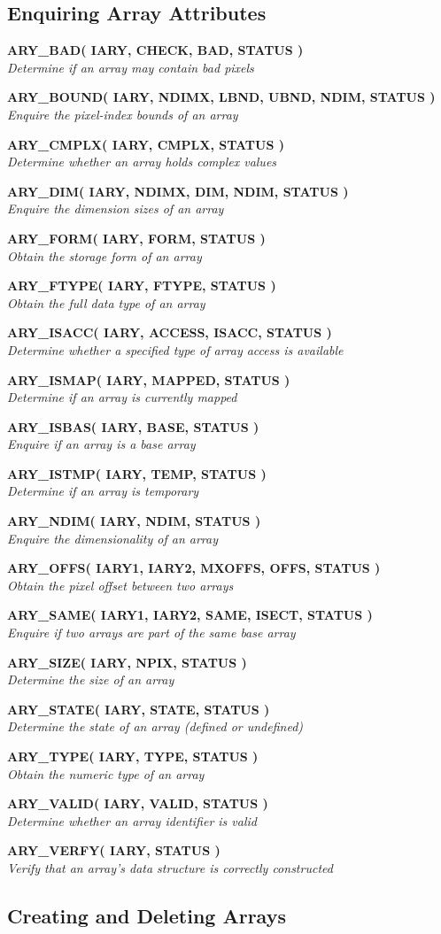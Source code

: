 \documentclass[twoside,11pt]{article}
\newcommand{\xlabel}[1]{}
\newcommand{\noteroutine}[2]{\textbf{#1}\hspace*{\fill}\nopagebreak \\
                             \hspace*{3em}\emph{#2}\hspace*{\fill}\par}
\begin{document}
\begin{eqn*}
\subsection{\xlabel{enquiring_array_attributes}Enquiring Array Attributes}
\label{enquiring_array_attributes}

\noteroutine{ARY\_BAD( IARY, CHECK, BAD, STATUS )}
            {Determine if an array may contain bad pixels}
\noteroutine{ARY\_BOUND( IARY, NDIMX, LBND, UBND, NDIM, STATUS )}
            {Enquire the pixel-index bounds of an array}
\noteroutine{ARY\_CMPLX( IARY, CMPLX, STATUS )}
            {Determine whether an array holds complex values}
\noteroutine{ARY\_DIM( IARY, NDIMX, DIM, NDIM, STATUS )}
            {Enquire the dimension sizes of an array}
\noteroutine{ARY\_FORM( IARY, FORM, STATUS )}
            {Obtain the storage form of an array}
\noteroutine{ARY\_FTYPE( IARY, FTYPE, STATUS )}
            {Obtain the full data type of an array}
\noteroutine{ARY\_ISACC( IARY, ACCESS, ISACC, STATUS )}
            {Determine whether a specified type of array access is available}
\noteroutine{ARY\_ISMAP( IARY, MAPPED, STATUS )}
            {Determine if an array is currently mapped}
\noteroutine{ARY\_ISBAS( IARY, BASE, STATUS )}
            {Enquire if an array is a base array}
\noteroutine{ARY\_ISTMP( IARY, TEMP, STATUS )}
            {Determine if an array is temporary}
\noteroutine{ARY\_NDIM( IARY, NDIM, STATUS )}
            {Enquire the dimensionality of an array}
\noteroutine{ARY\_OFFS( IARY1, IARY2, MXOFFS, OFFS, STATUS )}
            {Obtain the pixel offset between two arrays}
\noteroutine{ARY\_SAME( IARY1, IARY2, SAME, ISECT, STATUS )}
            {Enquire if two arrays are part of the same base array}
\noteroutine{ARY\_SIZE( IARY, NPIX, STATUS )}
            {Determine the size of an array}
\noteroutine{ARY\_STATE( IARY, STATE, STATUS )}
            {Determine the state of an array (defined or undefined)}
\noteroutine{ARY\_TYPE( IARY, TYPE, STATUS )}
            {Obtain the numeric type of an array}
\noteroutine{ARY\_VALID( IARY, VALID, STATUS )}
            {Determine whether an array identifier is valid}
\noteroutine{ARY\_VERFY( IARY, STATUS )}
            {Verify that an array's data structure is correctly constructed}

\subsection{\xlabel{creating_and_deleting_arrays}Creating and Deleting Arrays}
\label{creating_and_deleting_arrays}


\end{eqn*}
\end{document}
